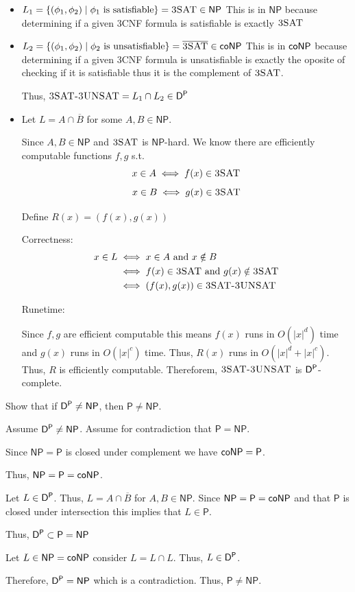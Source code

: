 \documentclass[12pt, letterpaper]{article}
\renewcommand{\P}{\mathsf{P}}
\newcommand{\NP}{\mathsf{NP}}
\renewcommand{\t}[1]{\text{#1}}
\begin{document}
\begin{problemproof}
    \begin{itemize}
        \item $L_1=\{(\phi_1,\phi_2) \mid \phi_1 \t{ is satisfiable}\}=\TSAT \in \NP$
        This is in $\NP$ because determining if a given 3CNF formula is satisfiable is exactly $\textsc{3SAT}$
        \item $L_2=\{(\phi_1,\phi_2) \mid \phi_2 \t{ is unsatisfiable}\}=\overline{\TSAT} \in \coNP$
        This is in $\mathsf{coNP}$ because determining if a given 3CNF formula is unsatisfiable is exactly the oposite of checking if it is satisfiable thus it is the complement of $\textsc{3SAT}$.

        Thus, $\textsc{3SAT-3UNSAT}=L_1 \cap L_2 \in \mathsf{D}^\mathsf{P}$
        
        \item Let $L=A \cap \overline{B}$ for some $A,B \in \NP$.
        
        Since $A,B \in \NP$ and $\textsc{3SAT}$ is $\NP$-hard. We know there are efficiently computable functions $f,g$ s.t.
        \[x \in A \iff f(x) \in \textsc{3SAT}\]
        \[x \in B \iff g(x) \in \textsc{3SAT}\]

        Define $R(x)=(f(x),g(x))$

        Correctness:
        \begin{align*}
            x \in L &\iff x \in A \t{ and } x \notin B\\
                    &\iff f(x) \in \TSAT \t{ and } g(x) \notin \TSAT\\
                    &\iff (f(x),g(x)) \in \TSTUS
        \end{align*}

        Runetime:

        Since $f,g$ are efficient computable this means $f(x)$ runs in $O(|x|^d)$ time and $g(x)$ runs in $O(|x|^c)$ time. Thus, $R(x)$ runs in $O(|x|^d+|x|^c)$. Thus, $R$ is efficiently computable. Thereforem, $\textsc{3SAT-3UNSAT}$ is $\mathsf{D}^\mathsf{P}$-complete.
    \end{itemize}
\end{problemproof}

\begin{subproblem}{}
    Show that if $\DP \neq \NP$, then $\P \neq \NP$.
\end{subproblem}
\begin{problemproof}
    Assume $\DP \neq \NP$. Assume for contradiction that $\P=\NP$.

    Since $\NP=\P$ is closed under complement we have $\coNP=\P$.

    Thus, $\NP=\P=\coNP$.

    Let $L \in \mathsf{D}^\mathsf{P}$. Thus, $L=A \cap \overline{B}$ for $A,B \in \NP$. Since $\NP=\P=\coNP$ and that $\P$ is closed under intersection this implies that $L \in \P$.

    Thus, $\DP \subset \P=\NP$

    Let $L \in \NP=\coNP$ consider $L=L \cap L$. Thus, $L \in \mathsf{D}^\mathsf{P}$.

    Therefore, $\DP = \NP$ which is a contradiction. Thus, $\P \neq \NP$.
\end{problemproof}
\end{document}
